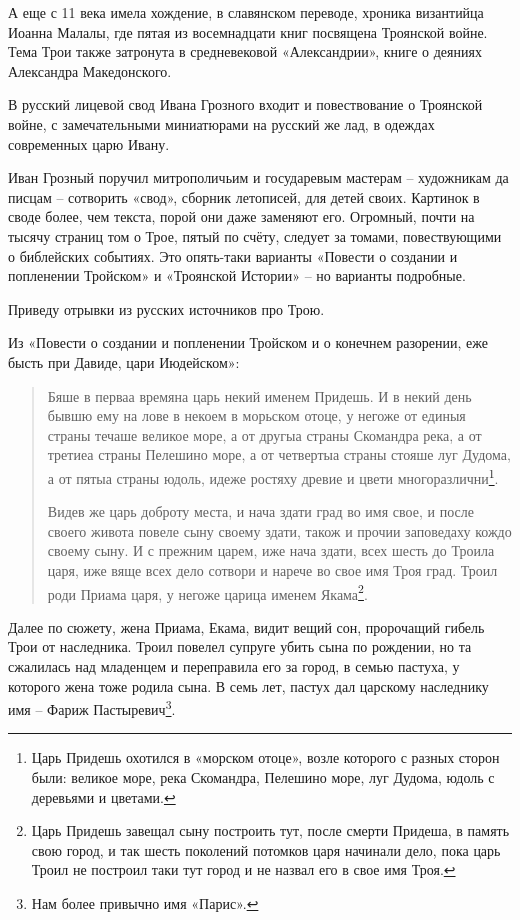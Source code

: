 А еще с 11 века имела хождение, в славянском переводе, хроника византийца Иоанна Малалы\cite{malala01}, где пятая из восемнадцати книг посвящена Троянской войне. Тема Трои также затронута в средневековой «Александрии», книге о деяниях Александра Македонского.

В русский лицевой свод Ивана Грозного входит и повествование о Троянской войне, с замечательными миниатюрами на русский же лад, в одеждах современных царю Ивану.

Иван Грозный поручил митрополичьим и государевым мастерам – художникам да писцам – сотворить «свод», сборник летописей, для детей своих. Картинок в своде более, чем текста, порой они даже заменяют его. Огромный, почти на тысячу страниц том о Трое, пятый по счёту, следует за томами, повествующими о библейских событиях. Это опять-таки варианты «Повести о создании и попленении Тройском» и «Троянской Истории» – но варианты подробные.

Приведу отрывки из русских источников про Трою.

Из «Повести о создании и попленении Тройском
и о конечнем разорении, еже бысть при Давиде,
цари Июдейском»\cite{troyaskaz}:

\begin{quotation}
Бяше в перваа времяна царь некий именем Придешь. И в некий день бывшю ему на лове в некоем в морьском отоце, у негоже от единыя страны течаше великое море, а от другыа страны Скомандра река, а от третиеа страны Пелешино море, а от четвертыа страны стояше луг Дудома, а от пятыа страны юдоль, идеже ростяху древие и цвети многоразлични\footnote{Царь Придешь охотился в «морском отоце», возле которого с разных сторон были: великое море, река Скомандра, Пелешино море, луг Дудома, юдоль с деревьями и цветами.}.

Видев же царь доброту места, и нача здати град во имя свое, и после своего живота повеле сыну своему здати, також и прочии заповедаху кождо своему сыну. И с прежним царем, иже нача здати, всех шесть до Троила царя, иже вяще всех дело сотвори и нарече во свое имя Троя град. Троил роди Приама царя, у негоже царица именем Якама\footnote{Царь Придешь завещал сыну построить тут, после смерти Придеша, в память свою город, и так шесть поколений потомков царя начинали дело, пока царь Троил не построил таки тут город и не назвал его в свое имя Троя.}.
\end{quotation}

Далее по сюжету, жена Приама, Екама, видит вещий сон, пророчащий гибель Трои от наследника. Троил повелел супруге убить сына по рождении, но та сжалилась над младенцем и переправила его за город, в семью пастуха, у которого жена тоже родила сына. В семь лет, пастух дал царскому наследнику имя – Фариж Пастыревич\footnote{Нам более привычно имя «Парис».}. 

